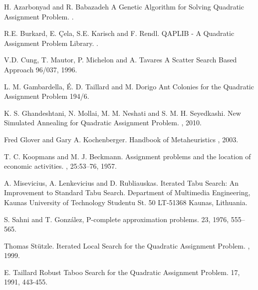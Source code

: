 \documentclass{ci5652}
\begin{document}
\begin{thebibliography}{99}

H. Azarbonyad and R. Babazadeh
\newblock A Genetic Algorithm for Solving Quadratic Assignment Problem.
.

R.E. Burkard, E. Çela, S.E. Karisch and F. Rendl.
\newblock QAPLIB - A Quadratic Assignment Problem Library.
.

V.D. Cung, T. Mautor, P. Michelon and A. Tavares
\newblock A Scatter Search Based Approach 
 96/037, 1996.

L. M. Gambardella, É. D. Taillard and M. Dorigo
\newblock Ant Colonies for the Quadratic Assignment Problem
 194/6.

K. S. Ghandeshtani, N. Mollai, M. M. Neshati and S. M. H. Seyedkashi.
\newblock New Simulated Annealing for Quadratic Assignment Problem.
, 2010.

Fred Glover and Gary A. Kochenberger.
\newblock Handbook of Metaheuristics
, 2003.

T. C. Koopmans and M. J. Beckmann. 
\newblock Assignment problems and the location of economic activities.
, 25:53–76, 1957.

A. Misevicius, A. Lenkevicius and D. Rubliauskas.
\newblock Iterated Tabu Search: An Improvement to Standard Tabu Search.
\newblock Department of Multimedia Engineering, Kaunas University of Technology Studentu St. 50 LT-51368 Kaunas, Lithuania.

S. Sahni and T. González, 
\newblock P-complete approximation problems.
 23, 1976, 555–565.

Thomas Stützle.
\newblock Iterated Local Search for the Quadratic Assignment Problem.
, 1999.

E. Taillard
\newblock Robust Taboo Search for the Quadratic Assignment Problem.
 17, 1991, 443-455.


\end{thebibliography}
\end{document}
